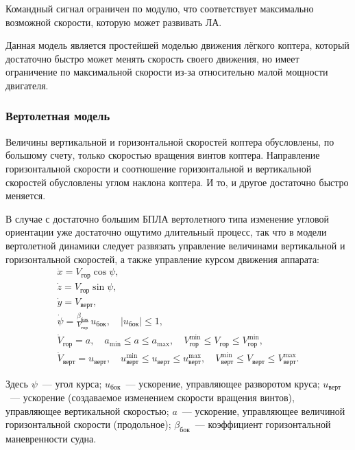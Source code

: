 \documentclass[a4paper,12pt]{article}
\begin{document}
Командный сигнал ограничен по модулю, что соответствует максимально возможной скорости, которую может развивать ЛА. 

Данная модель является простейшей моделью движения лёгкого коптера, который достаточно быстро может менять скорость своего движения, но имеет ограничение по максимальной скорости из-за относительно малой мощности двигателя. 

\subsubsection{Вертолетная модель}

Величины вертикальной и горизонтальной скоростей коптера обусловлены, по большому счету, только скоростью вращения винтов коптера. Направление горизонтальной скорости и соотношение горизонтальной и вертикальной скоростей обусловлены углом наклона коптера. И то, и другое достаточно быстро меняется.

В случае с достаточно большим БПЛА вертолетного типа изменение угловой ориентации уже достаточно ощутимо длительный процесс, так что в модели вертолетной динамики следует развязать управление величинами вертикальной и горизонтальной скоростей, а также управление курсом движения аппарата:
\begin{equation*}
  \begin{array}{l}
    \dot x = V_\text{гор} \cos \psi, \\[0.75ex]
    \dot z = V_\text{гор} \sin \psi, \\[0.75ex]
    \dot y = V_\text{верт}, \\[0.75ex]
    \dot \psi   = \frac{\beta_\text{бок}}{V_\text{гор}} \, u_\text{бок}, \quad |u_\text{бок}| \leqslant 1, \\[0.75ex]
    \dot V_\text{гор} = a, \quad  
      a_{\min} \leqslant a \leqslant a_{\max},
      \quad V^{\min}_\text{гор} \leqslant V_\text{гор} \leqslant V^{\min}_\text{гор}, \\[0.75ex]
    \dot V_\text{верт} = u_\text{верт},
      \quad u^{\min}_\text{верт} \leqslant u_\text{верт} \leqslant u^{\max}_\text{верт}, \quad
      V^{\min}_\text{верт} \leqslant V_\text{верт} \leqslant V^{\max}_\text{верт}.
  \end{array}
\end{equation*}

Здесь $\psi$~--- угол курса; $u_\text{бок}$~--- ускорение, управляющее разворотом круса; $u_\text{верт}$~--- ускорение (создаваемое изменением скорости вращения винтов), управляющее вертикальной скоростью; $a$~--- ускорение, управляющее величиной горизонтальной скорости (продольное); $\beta_\text{бок}$~--- коэффициент горизонтальной маневренности судна.
\end{document}
